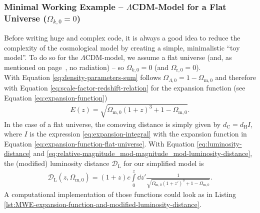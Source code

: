 \subsubsection{Minimal Working Example -- $\Lambda$CDM-Model for a Flat Universe ($\Omega_{k,0} = 0$)}
Before writing huge and complex code, it is always a good idea to reduce the complexity of the cosmological model by creating a simple, minimalistic ``toy model''.
To do so for the $\Lambda$CDM-model, we assume a flat universe (and, as mentioned on page~\pageref{no-radiation}, no radiation) -- so $\Omega_{k,0} = 0$ (and $\Omega_{\text{r},0} = 0$). \\
With Equation \eqref{eq:density-parameters-sum} follows $\Omega_{\Lambda,0} = 1 - \Omega_{\text{m},0}$ and therefore with Equation \eqref{eq:scale-factor-redshift-relation} for the expansion function (see Equation \eqref{eq:expansion-function})
\begin{align}
    E(z) = \sqrt{\Omega_{\text{m},0}(1 + z)^3 + 1 - \Omega_{\text{m},0}}. \label{eq:expansion-function-flat-universe} 
\end{align}
In the case of a flat universe, the comoving distance is simply given by $d_{\text{C}} = d_{\text{H}} I$, where $I$ is the expression \eqref{eq:expansion-integral} with the expansion function in Equation \eqref{eq:expansion-function-flat-universe}. With Equation \eqref{eq:luminosity-distance} and \eqref{eq:relative-magnitude_mod-magnitude_mod-luminosity-distance}, the (modified) luminosity distance $\mathcal{D}_{\text{L}}$ for our simplified model is 
\begin{align}
    \mathcal{D}_{\text{L}}(z, \Omega_{\text{m},0}) = (1 + z) c \int\limits_{0}^{z} \dd{z'} \frac{1}{\sqrt{\Omega_{\text{m},0}(1 + z')^3 + 1 - \Omega_{\text{m},0}}}. \label{eq:modified-luminosity-distance-flat-universe} 
\end{align}
A computational implementation of those functions could look as in Listing \ref{lst:MWE-expansion-function-and-modified-luminosity-distance}.

